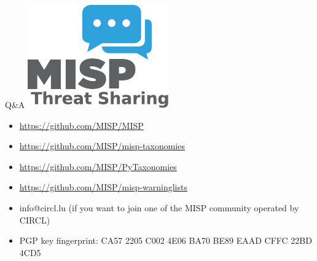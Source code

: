 \begin{frame}[t,fragile] {Q\&A}
\includegraphics[scale=0.5]{misplogo.pdf}
\begin{itemize}
        \item \url{https://github.com/MISP/MISP}
        \item \url{https://github.com/MISP/misp-taxonomies}
        \item \url{https://github.com/MISP/PyTaxonomies}
        \item \url{https://github.com/MISP/misp-warninglists}
        \item info@circl.lu (if you want to join one of the MISP community operated by CIRCL)
        \item PGP key fingerprint: CA57 2205 C002 4E06 BA70 BE89 EAAD CFFC 22BD 4CD5
\end{itemize}

\end{frame}


